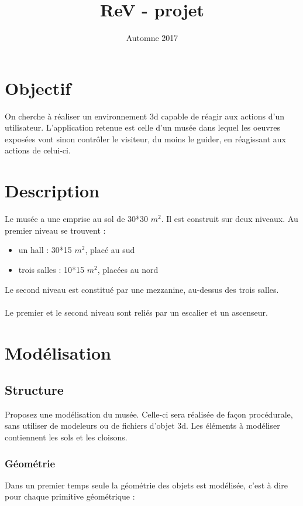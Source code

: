 \documentclass[10pt,a4paper]{article}
\title{ReV - projet}
\date{Automne 2017}
\begin{document}
\maketitle
	
	\section{Objectif}
	On cherche à réaliser un environnement 3d capable de réagir aux actions d'un utilisateur. L'application retenue est celle d'un musée dans lequel les oeuvres exposées vont sinon contrôler le visiteur, du moins le guider, en réagissant aux actions de celui-ci.

    \section{Description}
    Le musée a une emprise au sol de 30*30 $m^2$. Il est construit sur deux niveaux. Au premier niveau se trouvent : 
    \begin{itemize}
    	\item un hall : 30*15 $m^2$, placé au sud
    	\item trois salles : 10*15 $m^2$, placées au nord
    \end{itemize}
    Le second niveau est constitué par une mezzanine, au-dessus des trois salles.
    \\
    \\
    Le premier et le second niveau sont reliés par un escalier et un ascenseur.
    
    \section{Modélisation}
    
    \subsection{Structure}
    Proposez une modélisation du musée. Celle-ci sera réalisée de façon procédurale, sans utiliser de modeleurs ou de fichiers d'objet 3d. Les éléments 
    à modéliser contiennent les sols et les cloisons. 
    
    \subsubsection{Géométrie}
    Dans un premier temps seule la géométrie des objets est modélisée, c'est à dire pour chaque primitive géométrique : 
    
\end{document}
